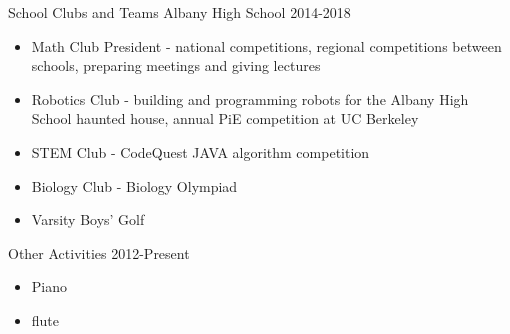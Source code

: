 
\begin{cventries}

  \cventry
    {} %
    {School Clubs and Teams} %
    {Albany High School} %
    {2014-2018} %
    {
      \begin{itemize} %
	\item Math Club President - national competitions, regional competitions between schools, preparing meetings and giving lectures
	\item Robotics Club - building and programming robots for the Albany High School haunted house, annual PiE competition at UC Berkeley
	\item STEM Club - CodeQuest JAVA algorithm competition
	\item Biology Club - Biology Olympiad
	\item Varsity Boys' Golf
      \end{itemize}
    }
\cventry
    {} %
    {Other Activities} %
    {} %
    {2012-Present} %
    {
      \begin{itemize} %
	\item Piano
	\item flute
      \end{itemize}
    }


\end{cventries}





